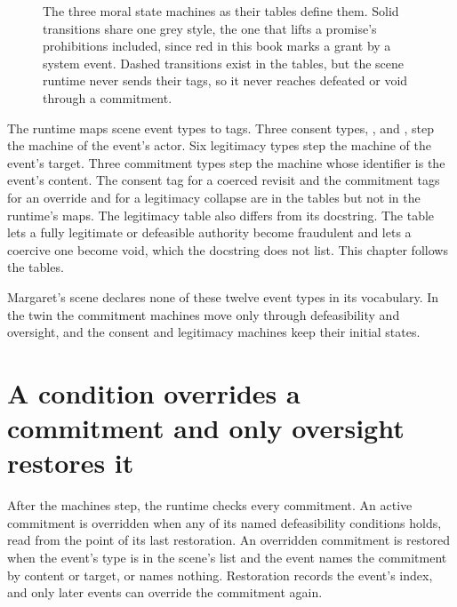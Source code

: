 \begin{figure}[t]
\centering

\caption{The three moral state machines as their tables define them. Solid transitions share
one grey style, the one that lifts a promise's prohibitions included, since red in this book marks
a grant by a system event. Dashed transitions exist in the tables, but the scene runtime never sends their tags, so it
never reaches defeated or void through a commitment.}
\label{fig:runtime-machines}
\end{figure}

The runtime maps scene event types to tags. Three consent types, ,
 and , step the machine of the event's actor. Six
legitimacy types step the machine of the event's target. Three commitment types step the machine
whose identifier is the event's content. The consent tag for a coerced revisit and the commitment
tags for an override and for a legitimacy collapse are in the tables but not in the runtime's maps.
The legitimacy table also differs from its docstring. The table lets a fully legitimate or
defeasible authority become fraudulent and lets a coercive one become void, which the docstring
does not list. This chapter follows the tables.

Margaret's scene declares none of these twelve event types in its vocabulary. In the twin the
commitment machines move only through defeasibility and oversight, and the consent and legitimacy
machines keep their initial states.

\section{A condition overrides a commitment and only oversight restores it}\label{sec:runtime-defeasible}

After the machines step, the runtime checks every commitment. An active commitment is overridden
when any of its named defeasibility conditions holds, read from the point of its last restoration.
An overridden commitment is restored when the event's type is in the scene's  list
and the event names the commitment by content or target, or names nothing. Restoration records the
event's index, and only later events can override the commitment again.

